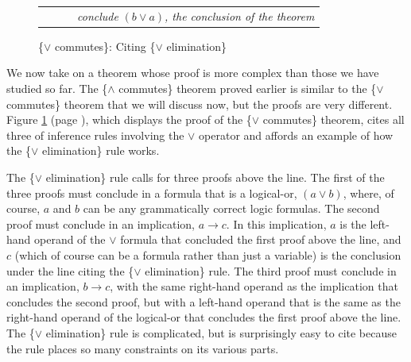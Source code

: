 {\begin{figure}
\begin{center}
\begin{tabular}{ll}
       &~~~~\emph{conclude} $(b \vee a)$\emph{, the conclusion of the theorem}\\
\end{tabular}
\end{center}
\caption{\{$\vee$ commutes\}: Citing \{$\vee$ elimination\}}
\label{fig:or-commutes-proof}
\end{figure}

We now take on a theorem whose proof is more complex
than those we have studied so far.
The \{$\wedge$ commutes\} theorem proved earlier
is similar to the \{$\vee$ commutes\} theorem
that we will discuss now, but the proofs are very different.
Figure \ref{fig:or-commutes-proof} (page \pageref{fig:or-commutes-proof}),
which displays the proof of the \{$\vee$ commutes\} theorem,
cites all three of inference rules involving the $\vee$ operator
and affords an example of how the \{$\vee$ elimination\} rule works.

The \{$\vee$ elimination\} rule calls for three proofs above the line.
The
first of the three proofs must conclude in a formula
that is a logical-or, $(a \vee b)$, where, of course,
$a$ and $b$ can be any grammatically correct logic formulas.
The second proof must conclude in an implication, $a \rightarrow c$.
In this implication, $a$ is the left-hand operand of the $\vee$ formula
that concluded the first proof above the line,
and $c$ (which of course can be a formula rather than just a variable)
is the conclusion under the line citing the \{$\vee$ elimination\} rule.
The third proof must conclude in an implication, $b \rightarrow c$,
with the same right-hand operand as the implication that concludes
the second proof, but with a left-hand operand that is the same
as the right-hand operand of the logical-or that concludes the
first proof above the line.
The \{$\vee$ elimination\} rule is complicated,
but is surprisingly easy to cite
because the rule places so many constraints on its various parts.

}
